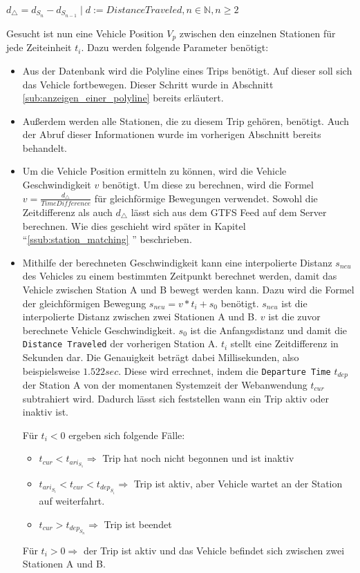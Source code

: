   $d_{\triangle} = d_{S_n} - d_{S_{n-1}}\;|\; d := DistanceTraveled, n \in \mathbb{N}, n \ge 2$

  Gesucht ist nun eine Vehicle Position $V_p$ zwischen den einzelnen Stationen für jede Zeiteinheit $t_i$. Dazu werden folgende Parameter benötigt:

  \begin{itemize}
    \item Aus der Datenbank wird die Polyline eines Trips benötigt. Auf dieser soll sich das Vehicle fortbewegen. Dieser Schritt wurde in Abschnitt \ref{sub:anzeigen_einer_polyline} bereits erläutert.

    \item Außerdem werden alle Stationen, die zu diesem Trip gehören, benötigt. Auch der Abruf dieser Informationen wurde im vorherigen Abschnitt bereits behandelt.

    \item Um die Vehicle Position ermitteln zu können, wird die Vehicle Geschwindigkeit $v$ benötigt. Um diese zu berechnen, wird die Formel $v = \frac{d_\triangle}{TimeDifference}$ für gleichförmige Bewegungen verwendet. Sowohl die Zeitdifferenz als auch $d_\triangle$ lässt sich aus dem GTFS Feed auf dem Server berechnen. Wie dies geschieht wird später in Kapitel "`\ref{ssub:station_matching} "' beschrieben.

    \item Mithilfe der berechneten Geschwindigkeit kann eine interpolierte Distanz $s_{neu}$ des Vehicles zu einem bestimmten Zeitpunkt berechnet werden, damit das Vehicle zwischen Station A und B bewegt werden kann. Dazu wird die Formel der gleichförmigen Bewegung $s_{neu} = v * t_i + s_0$ benötigt. $s_{neu}$ ist die interpolierte Distanz zwischen zwei Stationen A und B. $v$ ist die zuvor berechnete Vehicle Geschwindigkeit. $s_0$ ist die Anfangsdistanz und damit die \texttt{Distance Traveled} der vorherigen Station A. $t_i$ stellt eine Zeitdifferenz in Sekunden dar. Die Genauigkeit beträgt dabei Millisekunden, also beispielsweise $1.522 sec$. Diese wird errechnet, indem die \texttt{Departure Time} $t_{dep}$ der Station A von der momentanen Systemzeit der Webanwendung $t_{cur}$ subtrahiert wird. Dadurch lässt sich feststellen wann ein Trip aktiv oder inaktiv ist.

    Für $t_i < 0$ ergeben sich folgende Fälle: 
    \begin{itemize}[label={}]
      \item $t_{cur} < t_{ari_{S_1}} \Rightarrow$ Trip hat noch nicht begonnen und ist inaktiv

      \item $t_{ari_{S_{i}}} < t_{cur} < t_{dep_{S_i}} \Rightarrow$ Trip ist aktiv, aber Vehicle wartet an der Station auf weiterfahrt. 

      \item $t_{cur} > t_{dep_{S_n}} \Rightarrow$ Trip ist beendet
    \end{itemize}

    Für $t_i > 0 \Rightarrow$ der Trip ist aktiv und das Vehicle befindet sich zwischen zwei Stationen A und B.

  \end{itemize}
  
